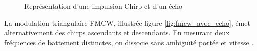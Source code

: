 \begin{figure}[htbp]
    \caption{Représentation d'une impulsion Chirp et d'un écho}
    \label{fig:impulsions_chirp_avec_echo}
\end{figure}

La modulation triangulaire FMCW, illustrée figure \ref{fig:fmcw_avec_echo}, émet alternativement des chirps ascendants et descendants. En mesurant deux fréquences de battement distinctes, on dissocie sans ambiguïté portée et vitesse \cite{richards2010}.

